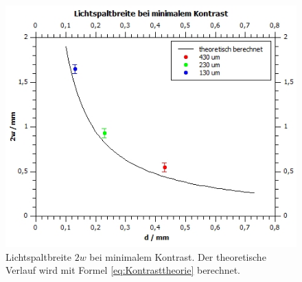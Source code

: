 \documentclass[12pt,a4paper,twoside]{article}
\begin{document}
\begin{figure}[H]
    \centering
    \includegraphics[width=0.7\linewidth]{nudes/aufgabe 4 plot.jpg}
    \caption{Lichtspaltbreite $2w$ bei minimalem Kontrast. Der theoretische Verlauf wird mit Formel \ref{eq:Kontrasttheorie} berechnet. }
    \label{fig:zus aufgabe 4 kontrast}
\end{figure}

\printbibliography[heading=bibintoc]
\end{document}
